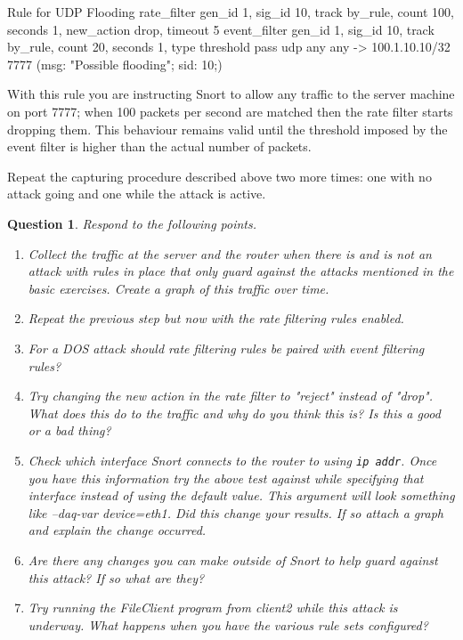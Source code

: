 \documentclass[a4paper,11pt,hidelinks]{article}
\newtheorem{theorem}{Question}[subsection]
\begin{document}
\begin{code}{Rule for UDP Flooding}
rate_filter gen_id 1, sig_id 10, track by_rule, count 100, 
    seconds 1, new_action drop, timeout 5
event_filter gen_id 1, sig_id 10, track by_rule, count 20,
    seconds 1, type threshold
pass udp any any -> 100.1.10.10/32 7777 (msg: "Possible flooding"; sid: 10;) 
\end{code}

With this rule you are instructing Snort to allow any traffic to the server machine on port 7777; when 100 packets per second are matched then the rate filter starts dropping them. This behaviour remains valid until the threshold imposed by the event filter is higher than the actual number of packets.

Repeat the capturing procedure described above two more times: one with no attack going and one while the attack is active.

\begin{theorem}
    Respond to the following points.
    \begin{enumerate}
        \item Collect the traffic at the server and the router when there is and is not an attack with rules in place that only guard against the attacks mentioned in the basic exercises. Create a graph of this traffic over time.
        \item Repeat the previous step but now with the rate filtering rules enabled.
        \item For a DOS attack should rate filtering rules be paired with event filtering rules?
        \item Try changing the new action in the rate filter to "reject" instead of "drop". What does this do to the traffic and why do you think this is? Is this a good or a bad thing?
        \item Check which interface Snort connects to the router to using \verb=ip addr=. Once you have this information try the above test against while specifying that interface instead of using the default value. This argument will look something like --daq-var device=eth1. Did this change your results. If so attach a graph and explain the change occurred.
        \item Are there any changes you can make outside of Snort to help guard against this attack? If so what are they?
        \item Try running the FileClient program from client2 while this attack is underway. What happens when you have the various rule sets configured?
    \end{enumerate}
\end{theorem}
\end{document}

